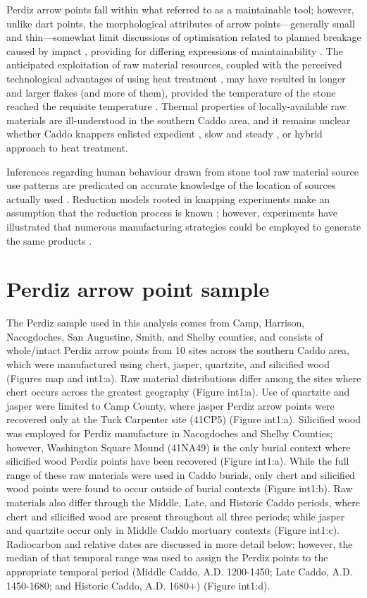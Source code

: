 \documentclass[review]{elsarticle}
\begin{document}
Perdiz arrow points fall within what \citet[738-741]{RN5873} referred to as a maintainable tool; however, unlike dart points, the morphological attributes of arrow points—generally small and thin—somewhat limit discussions of optimisation related to planned breakage caused by impact \citep{RN6170,RN7045}, providing for differing expressions of maintainability \citep{RN5789}. The anticipated exploitation of raw material resources, coupled with the perceived technological advantages of using heat treatment \citep{RN6171} , may have resulted in longer and larger flakes (and more of them), provided the temperature of the stone reached the requisite temperature \citep{RN5900}. Thermal properties of locally-available raw materials are ill-understood in the southern Caddo area, and it remains unclear whether Caddo knappers enlisted expedient \citep{RN8970,RN6201}, slow and steady \citep{RN8971}, or hybrid approach to heat treatment.

Inferences regarding human behaviour drawn from stone tool raw material source use patterns are predicated on accurate knowledge of the location of sources actually used \citep[365]{RN5787}. Reduction models rooted in knapping experiments make an assumption that the reduction process is known \citep{RN6855}; however, experiments have illustrated that numerous manufacturing strategies could be employed to generate the same products \citep{RN8968,RN8969}. 

\section*{Perdiz arrow point sample}

The Perdiz sample used in this analysis comes from Camp, Harrison, Nacogdoches, San Augustine, Smith, and Shelby counties, and consists of whole/intact Perdiz arrow points from 10 sites across the southern Caddo area, which were manufactured using chert, jasper, quartzite, and silicified wood (Figures map and int1:a). Raw material distributions differ among the sites where chert occurs across the greatest geography (Figure int1:a). Use of quartzite and jasper were limited to Camp County, where jasper Perdiz arrow points were recovered only at the Tuck Carpenter site (41CP5) (Figure int1:a). Silicified wood was employed for Perdiz manufacture in Nacogdoches and Shelby Counties; however, Washington Square Mound (41NA49) is the only burial context where silicified wood Perdiz points have been recovered (Figure int1:a). While the full range of these raw materials were used in Caddo burials, only chert and silicified wood points were found to occur outside of burial contexts (Figure int1:b). Raw materials also differ through the Middle, Late, and Historic Caddo periods, where chert and silicified wood are present throughout all three periods; while jasper and quartzite occur only in Middle Caddo mortuary contexts (Figure int1:c). Radiocarbon and relative dates are discussed in more detail below; however, the median of that temporal range was used to assign the Perdiz points to the appropriate temporal period (Middle Caddo, A.D. 1200-1450; Late Caddo, A.D. 1450-1680; and Historic Caddo, A.D. 1680+) (Figure int1:d).
\end{document}
